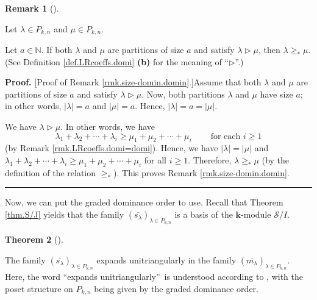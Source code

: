 \documentclass[numbers=enddot,12pt,final,onecolumn,notitlepage]{scrartcl}%
\theoremstyle{definition}
\newtheorem{theo}{Theorem}[section]
\newenvironment{theorem}[1][]
{\begin{theo}[#1]\begin{leftbar}}
{\end{leftbar}\end{theo}}
\newtheorem{remk}[theo]{Remark}
\newenvironment{remark}[1][]
{\begin{remk}[#1]\begin{leftbar}}
{\end{leftbar}\end{remk}}
\newenvironment{proof}[1][Proof]{\noindent\textbf{#1.} }{\ \rule{0.5em}{0.5em}}
\begin{document}
\begin{remark}
\label{rmk.size-domin.domin}Let $\lambda\in P_{k,n}$ and $\mu\in P_{k,n}$.

Let $a\in\mathbb{N}$. If both $\lambda$ and $\mu$ are partitions of size $a$
and satisfy $\lambda\triangleright\mu$, then $\lambda\geq_{\ast}\mu$. (See
Definition \ref{def.LRcoeffs.domi} \textbf{(b)} for the meaning of
\textquotedblleft$\triangleright$\textquotedblright.)
\end{remark}

\begin{proof}
[Proof of Remark \ref{rmk.size-domin.domin}.]Assume that both $\lambda$ and
$\mu$ are partitions of size $a$ and satisfy $\lambda\triangleright\mu$. Now,
both partitions $\lambda$ and $\mu$ have size $a$; in other words, $\left\vert
\lambda\right\vert =a$ and $\left\vert \mu\right\vert =a$. Hence, $\left\vert
\lambda\right\vert =a=\left\vert \mu\right\vert $.

We have $\lambda\triangleright\mu$. In other words, we have
\[
\lambda_{1}+\lambda_{2}+\cdots+\lambda_{i}\geq\mu_{1}+\mu_{2}+\cdots+\mu
_{i}\ \ \ \ \ \ \ \ \ \ \text{for each }i\geq1
\]
(by Remark \ref{rmk.LRcoeffs.domi=domi}). Hence, we have $\left\vert
\lambda\right\vert =\left\vert \mu\right\vert $ and $\lambda_{1}+\lambda
_{2}+\cdots+\lambda_{i}\geq\mu_{1}+\mu_{2}+\cdots+\mu_{i}$ for all $i\geq1$.
Therefore, $\lambda\geq_{\ast}\mu$ (by the definition of the relation
$\geq_{\ast}$). This proves Remark \ref{rmk.size-domin.domin}.
\end{proof}

Now, we can put the graded dominance order to use. Recall that Theorem
\ref{thm.S/J} yields that the family $\left(  \overline{s_{\lambda}}\right)
_{\lambda\in P_{k,n}}$ is a basis of the $\mathbf{k}$-module $\mathcal{S}/I$.

\begin{theorem}
\label{thm.s-m-triangularity}The family $\left(  \overline{s_{\lambda}%
}\right)  _{\lambda\in P_{k,n}}$ expands unitriangularly in the family
$\left(  \overline{m_{\lambda}}\right)  _{\lambda\in P_{k,n}}$. Here, the word
\textquotedblleft expands unitriangularly\textquotedblright\ is understood
according to \cite[Definition 11.1.16(c)]{GriRei18}, with the poset structure
on $P_{k,n}$ being given by the graded dominance order.
\end{theorem}
\end{document}
